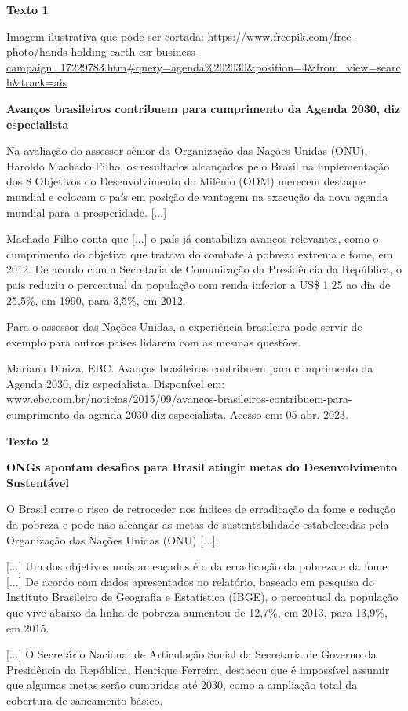 \begin{itemize}
\begin{itemize}
\textbf{Texto 1}

Imagem ilustrativa que pode ser cortada:
\url{https://www.freepik.com/free-photo/hands-holding-earth-csr-business-campaign_17229783.htm\#query=agenda\%202030\&position=4\&from_view=search\&track=ais}

\textbf{Avanços brasileiros contribuem para cumprimento da Agenda 2030,
diz especialista}

Na avaliação do assessor sênior da Organização das Nações Unidas (ONU),
Haroldo Machado Filho, os resultados alcançados pelo Brasil na
implementação dos 8 Objetivos do Desenvolvimento do Milênio (ODM)
merecem destaque mundial e colocam o país em posição de vantagem na
execução da nova agenda mundial para a prosperidade. {[}...{]}

Machado Filho conta que {[}...{]} o país já contabiliza avanços
relevantes, como o cumprimento do objetivo que tratava do combate à
pobreza extrema e fome, em 2012. De acordo com a Secretaria de
Comunicação da Presidência da República, o país reduziu o percentual da
população com renda inferior a US\$ 1,25 ao dia de 25,5\%, em 1990, para
3,5\%, em 2012.

Para o assessor das Nações Unidas, a experiência brasileira pode servir
de exemplo para outros países lidarem com as mesmas questões.

Mariana Diniza. EBC. Avanços brasileiros contribuem para cumprimento da
Agenda 2030, diz especialista. Disponível em:
www.ebc.com.br/noticias/2015/09/avancos-brasileiros-contribuem-para-cumprimento-da-agenda-2030-diz-especialista.
Acesso em: 05 abr. 2023.

\textbf{Texto 2}

\textbf{ONGs apontam desafios para Brasil atingir metas do
Desenvolvimento Sustentável}

O Brasil corre o risco de retroceder nos índices de erradicação da fome
e redução da pobreza e pode não alcançar as metas de sustentabilidade
estabelecidas pela Organização das Nações Unidas (ONU) {[}...{]}.

{[}...{]} Um dos objetivos mais ameaçados é o da erradicação da pobreza
e da fome. {[}...{]} De acordo com dados apresentados no relatório,
baseado em pesquisa do Instituto Brasileiro de Geografia e Estatística
(IBGE), o percentual da população que vive abaixo da linha de pobreza
aumentou de 12,7\%, em 2013, para 13,9\%, em 2015.

{[}...{]} O Secretário Nacional de Articulação Social da Secretaria de
Governo da Presidência da República, Henrique Ferreira, destacou que é
impossível assumir que algumas metas serão cumpridas até 2030, como a
ampliação total da cobertura de saneamento básico.


\end{itemize}
\end{itemize}
